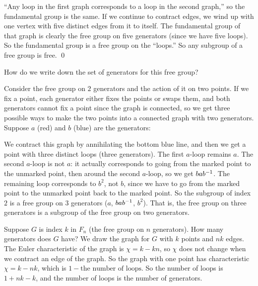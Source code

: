 \documentclass[11pt, twoside]{amsart}
\begin{document}
``Any loop in the first graph corresponds to a loop in the second graph,'' so the fundamental group is the same. If we continue to contract edges, we wind up with one vertex with five distinct edges from it to itself. The fundamental group of that graph is clearly the free group on five generators (since we have five loops). So the fundamental group is a free group on the ``loops.'' So any subgroup of a free group is free. \hfill \qed

How do we write down the set of generators for this free group? 
\begin{example}
Consider the free group on $2$ generators and the action of it on two points. If we fix a point, each generator either fixes the points or swaps them, and both generators cannot fix a point since the graph is connected, so we get three possible ways to make the two points into a connected graph with two generators. Suppose $a$ (red) and $b$ (blue) are the generators:
\begin{center}
\end{center}
We contract this graph by annihilating the bottom blue line, and then we get a point with three distinct loops (three generators). The first $a$-loop remains $a$. The second $a$-loop is not $a$: it actually corresponds to going from the marked point to the unmarked point, then around the second $a$-loop, so we get $b ab^{-1}$. The remaining loop corresponds to $b^2$, not $b$, since we have to go from the marked point to the unmarked point back to the marked point. So the subgroup of index $2$ is a free group on $3$ generators ($a$, $bab^{-1}$, $b^2$). That is, the free group on three generators is a subgroup of the free group on two generators.
\end{example}

Suppose $G$ is index $k$ in $F_n$ (the free group on $n$ generators). How many generators does $G$ have? We draw the graph for $G$ with $k$ points and $nk$ edges. The Euler characteristic of the graph is $\chi= k-kn$, so $\chi$ does not change when we contract an edge of the graph. So the graph with one point has characteristic $\chi = k-nk$, which is $1-\textrm{the number of loops}$. So the number of loops is $1 + nk - k$, and the number of loops is the number of generators.
\end{document}
